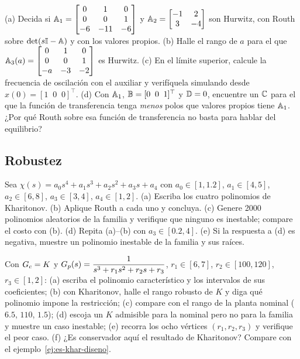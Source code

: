 \begin{problema}\label{prob:es-matrices}
(a) Decida si $\mathbb{A}_1=\begin{bmatrix}0&1&0\\0&0&1\\-6&-11&-6\end{bmatrix}$ y $\mathbb{A}_2=\begin{bmatrix}-1&2\\3&-4\end{bmatrix}$ son Hurwitz, con Routh sobre $\det(s\mathbb{I}-\mathbb{A})$ y con los valores propios. (b) Halle el rango de $a$ para el que $\mathbb{A}_3(a)=\begin{bmatrix}0&1&0\\0&0&1\\-a&-3&-2\end{bmatrix}$ es Hurwitz. (c) \etiquetaM{} En el límite superior, calcule la frecuencia de oscilación con el auxiliar y verifíquela simulando desde $x(0)=[1\;\;0\;\;0]^\top$. (d) Con $\mathbb{A}_1$, $\mathbb{B}=[0\;\;0\;\;1]^\top$ y $\mathbb{D}=0$, encuentre un $\mathbb{C}$ para el que la función de transferencia tenga \emph{menos} polos que valores propios tiene $\mathbb{A}_1$. ¿Por qué Routh sobre esa función de transferencia no basta para hablar del equilibrio?
\end{problema}

\subsection*{Robustez}

\begin{problema}\label{prob:es-familia}
Sea $\chi(s)=a_0s^4+a_1s^3+a_2s^2+a_3s+a_4$ con $a_0\in[1,1.2]$, $a_1\in[4,5]$, $a_2\in[6,8]$, $a_3\in[3,4]$, $a_4\in[1,2]$. (a) Escriba los cuatro polinomios de Kharitonov. (b) Aplique Routh a cada uno y concluya. (c) \etiquetaM{} Genere 2000 polinomios aleatorios de la familia y verifique que ninguno es inestable; compare el costo con (b). (d) Repita (a)--(b) con $a_3\in[0.2,4]$. (e) Si la respuesta a (d) es negativa, muestre un polinomio inestable de la familia y sus raíces.
\end{problema}

\begin{problema}\label{prob:es-incierta}
\etiquetaEstrella{} Con $G_c=K$ y $G_p(s)=\dfrac{1}{s^3+r_1s^2+r_2s+r_3}$, $r_1\in[6,7]$, $r_2\in[100,120]$, $r_3\in[1,2]$: (a) escriba el polinomio característico y los intervalos de sus coeficientes; (b) con Kharitonov, halle el rango robusto de $K$ y diga qué polinomio impone la restricción; (c) compare con el rango de la planta nominal ($6.5$, $110$, $1.5$); (d) escoja un $K$ admisible para la nominal pero no para la familia y muestre un caso inestable; (e) \etiquetaM{} recorra los ocho vértices $(r_1,r_2,r_3)$ y verifique el peor caso. (f) ¿Es conservador aquí el resultado de Kharitonov? Compare con el ejemplo~\ref{ej:es-khar-diseno}.
\end{problema}

